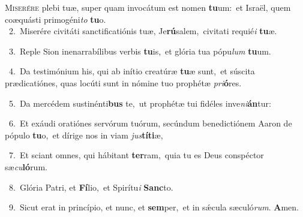 \lettrine{\initial\textcolor{\initialcolor}{M}}{iserére} plebi tuæ, super quam invocátum est nomen \textbf{tu}\-um:~\star et Israël, quem coæquásti primogéni\textit{to} \textbf{tu}\-o.\\
{\numbfont\textcolor{\numbcolor}{~2.}}~Miserére civitáti sanctificatiónis tuæ, Je\-\textbf{rú}\-salem,~\star civitati requié\textit{i} \textbf{tu}\-æ.\par
{\numbfont\textcolor{\numbcolor}{~3.}}~Reple Sion inenarrabílibus verbis \textbf{tu}\-is,~\star et glória tua pópu\textit{lum} \textbf{tu}\-um.\par
{\numbfont\textcolor{\numbcolor}{~4.}}~Da testimónium his, qui ab inítio creatúræ \textbf{tu}\-æ sunt,~\star et súscita prædicatiónes, quas locúti sunt in nómine tuo prophétæ \textit{pri}\-\textbf{ó}res.\par
{\numbfont\textcolor{\numbcolor}{~5.}}~Da mercédem sustinénti\textbf{bus} te,~\star ut prophétæ tui fidéles inve\-\textit{ni}\-\textbf{án}tur:\par
{\numbfont\textcolor{\numbcolor}{~6.}}~Et exáudi oratiónes servórum tuórum, secúndum benedictiónem Aaron de pópulo \textbf{tu}\-o,~\star et dírige nos in viam \textit{jus}\-\textbf{tí}\textbf{ti}æ,\par
{\numbfont\textcolor{\numbcolor}{~7.}}~Et sciant omnes, qui hábitant \textbf{ter}\-ram,~\star quia tu es Deus conspéctor sæ\-\textit{cu}\-\textbf{ló}rum.\par
{\numbfont\textcolor{\numbcolor}{~8.}}~Glória Patri, et \textbf{Fí}\-lio,~\star et Spirítu\textit{i} \textbf{Sanc}\-to.\par
{\numbfont\textcolor{\numbcolor}{~9.}}~Sicut erat in princípio, et nunc, et \textbf{sem}\-per,~\star et in sǽcula sæculó\-\textit{rum}\-. \textbf{A}\-men.\par
